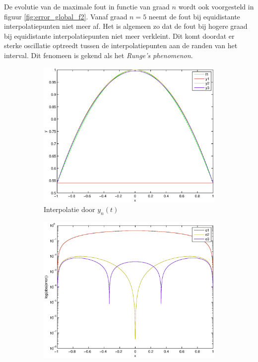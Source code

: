 \documentclass[a4paper]{article}
\begin{document}
\begin{enumerate}[a)]
De evolutie van de maximale fout in functie van graad $n$ wordt ook voorgesteld in figuur \ref{fig:error_global_f2}. Vanaf graad $n=5$ neemt de fout bij equidistante interpolatiepunten niet meer af. Het is algemeen zo dat de fout bij hogere graad bij equidistante interpolatiepunten niet meer verkleint. Dit komt doordat er sterke oscillatie optreedt tussen de interpolatiepunten aan de randen van het interval. Dit fenomeen is gekend als het \textit{Runge's phenomenon}.
\end{enumerate}


\begin{figure}
    \centering
    \begin{subfigure}[t]{0.45\textwidth}
        \centering
        \includegraphics[width=\textwidth]{Jona/linspace_cos_interpolation.eps}
        \caption{Interpolatie door $y_{n}(t)$}
        \label{fig:lin_cos_interpol}
        \vspace*{1cm}
    \end{subfigure}
    \begin{subfigure}[t]{0.45\textwidth}
        \centering
        \includegraphics[width=\textwidth]{Jona/linspace_cos_error.eps}

\end{subfigure}
\end{figure}
\end{document}
